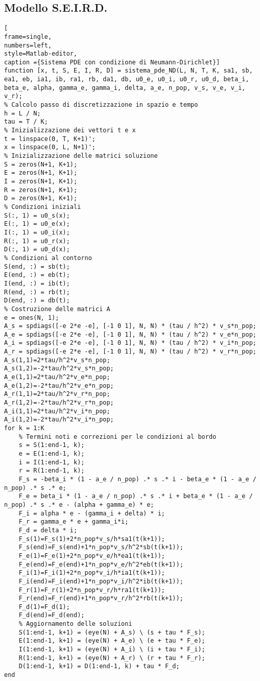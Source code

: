 \documentclass[11pt]{article}
\begin{document}
\newpage
\subsection{Modello S.E.I.R.D.}\label{seird}
\begin{lstlisting}[
frame=single,
numbers=left,
style=Matlab-editor,
caption ={Sistema PDE con condizione di Neumann-Dirichlet}]
function [x, t, S, E, I, R, D] = sistema_pde_ND(L, N, T, K, sa1, sb, ea1, eb, ia1, ib, ra1, rb, da1, db, u0_e, u0_i, u0_r, u0_d, beta_i, beta_e, alpha, gamma_e, gamma_i, delta, a_e, n_pop, v_s, v_e, v_i, v_r);
% Calcolo passo di discretizzazione in spazio e tempo
h = L / N;
tau = T / K;
% Inizializzazione dei vettori t e x
t = linspace(0, T, K+1)';
x = linspace(0, L, N+1)';
% Inizializzazione delle matrici soluzione
S = zeros(N+1, K+1);
E = zeros(N+1, K+1);
I = zeros(N+1, K+1);
R = zeros(N+1, K+1);
D = zeros(N+1, K+1);
% Condizioni iniziali
S(:, 1) = u0_s(x);
E(:, 1) = u0_e(x);
I(:, 1) = u0_i(x);
R(:, 1) = u0_r(x);
D(:, 1) = u0_d(x);
% Condizioni al contorno
S(end, :) = sb(t);
E(end, :) = eb(t);
I(end, :) = ib(t);
R(end, :) = rb(t);
D(end, :) = db(t);
% Costruzione delle matrici A
e = ones(N, 1);
A_s = spdiags([-e 2*e -e], [-1 0 1], N, N) * (tau / h^2) * v_s*n_pop;
A_e = spdiags([-e 2*e -e], [-1 0 1], N, N) * (tau / h^2) * v_e*n_pop;
A_i = spdiags([-e 2*e -e], [-1 0 1], N, N) * (tau / h^2) * v_i*n_pop;
A_r = spdiags([-e 2*e -e], [-1 0 1], N, N) * (tau / h^2) * v_r*n_pop;
A_s(1,1)=2*tau/h^2*v_s*n_pop;
A_s(1,2)=-2*tau/h^2*v_s*n_pop;
A_e(1,1)=2*tau/h^2*v_e*n_pop;
A_e(1,2)=-2*tau/h^2*v_e*n_pop;
A_r(1,1)=2*tau/h^2*v_r*n_pop;
A_r(1,2)=-2*tau/h^2*v_r*n_pop;
A_i(1,1)=2*tau/h^2*v_i*n_pop;
A_i(1,2)=-2*tau/h^2*v_i*n_pop;
for k = 1:K
    % Termini noti e correzioni per le condizioni al bordo
    s = S(1:end-1, k);
    e = E(1:end-1, k);
    i = I(1:end-1, k);
    r = R(1:end-1, k);
    F_s = -beta_i * (1 - a_e / n_pop) .* s .* i - beta_e * (1 - a_e / n_pop) .* s .* e;
    F_e = beta_i * (1 - a_e / n_pop) .* s .* i + beta_e * (1 - a_e / n_pop) .* s .* e - (alpha + gamma_e) * e;
    F_i = alpha * e - (gamma_i + delta) * i;
    F_r = gamma_e * e + gamma_i*i;
    F_d = delta * i;
    F_s(1)=F_s(1)+2*n_pop*v_s/h*sa1(t(k+1)); 
    F_s(end)=F_s(end)+1*n_pop*v_s/h^2*sb(t(k+1)); 
    F_e(1)=F_e(1)+2*n_pop*v_e/h*ea1(t(k+1));
    F_e(end)=F_e(end)+1*n_pop*v_e/h^2*eb(t(k+1));
    F_i(1)=F_i(1)+2*n_pop*v_i/h*ia1(t(k+1));
    F_i(end)=F_i(end)+1*n_pop*v_i/h^2*ib(t(k+1));
    F_r(1)=F_r(1)+2*n_pop*v_r/h*ra1(t(k+1));
    F_r(end)=F_r(end)+1*n_pop*v_r/h^2*rb(t(k+1));
    F_d(1)=F_d(1);
    F_d(end)=F_d(end);
    % Aggiornamento delle soluzioni
    S(1:end-1, k+1) = (eye(N) + A_s) \ (s + tau * F_s);
    E(1:end-1, k+1) = (eye(N) + A_e) \ (e + tau * F_e);
    I(1:end-1, k+1) = (eye(N) + A_i) \ (i + tau * F_i);
    R(1:end-1, k+1) = (eye(N) + A_r) \ (r + tau * F_r);
    D(1:end-1, k+1) = D(1:end-1, k) + tau * F_d;
end
\end{lstlisting}

\printindex
\end{document}
